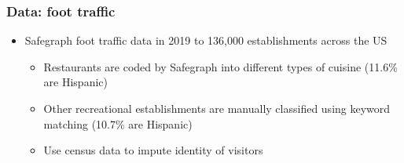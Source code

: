 \documentclass{beamer}
\begin{document}
\begin{frame}
\frametitle{Data: foot traffic}
\begin{itemize}
\item Safegraph foot traffic data in 2019 to 136,000 establishments across the US
\begin{itemize}
\item Restaurants are coded by Safegraph into different types of cuisine (11.6\% are Hispanic)
\item Other recreational establishments are manually classified using keyword matching (10.7\% are Hispanic)
\item Use census data to impute identity of visitors
\end{itemize}
\end{itemize}
\end{frame}
\end{document}
